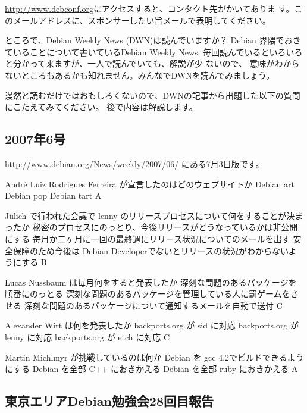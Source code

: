 \documentclass[mingoth,a4paper]{jsarticle}
\begin{document}
 \url{http://www.debconf.org}にアクセスすると、コンタクト先がかいてありま
す。このメールアドレスに、スポンサーしたい旨メールで表明してください。


ところで、Debian Weekly News (DWN)は読んでいますか？
Debian 界隈でおきていることについて書いているDebian Weekly News.
毎回読んでいるといろいろと分かって来ますが、一人で読んでいても、解説が少
ないので、
意味がわからないところもあるかも知れません。みんなでDWNを読んでみましょう。

漫然と読むだけではおもしろくないので、DWNの記事から出題した以下の質問にこたえてみてください。
後で内容は解説します。

\subsection{2007年6号}
\url{http://www.debian.org/News/weekly/2007/06/}
にある7月3日版です。

\santaku
{Andr\'e Luiz Rodrigues Ferreira が宣言したのはどのウェブサイトか}
{Debian art}
{Debian pop}
{Debian tart}
{A}

\santaku
{J\"ulich で行われた会議で lenny のリリースプロセスについて何をすることが決まったか}
{秘密のプロセスにのっとり、今後リリースがどうなっているかは非公開にする}
{毎月か二ヶ月に一回の最終週にリリース状況についてのメールを出す}
{安全保障のため今後は Debian Developerでないとリリースの状況がわからないようにする}
{B}

\santaku
{Lucas Nussbaum は毎月何をすると発表したか}
{深刻な問題のあるパッケージを順番にのっとる}
{深刻な問題のあるパッケージを管理している人に罰ゲームをさせる}
{深刻な問題のあるパッケージについて通知するメールを自動で送付}
{C}

\santaku
{Alexander Wirt は何を発表したか}
{backports.org が sid に対応}
{backports.org が lenny に対応}
{backports.org が etch に対応}
{C}

\santaku
{Martin Michlmyr が挑戦しているのは何か}
{Debian を gcc 4.2でビルドできるようにする}
{Debian を全部 C++ におきかえる}
{Debian を全部 ruby におきかえる}
{A}


\subsection{東京エリアDebian勉強会28回目報告}
\end{document}
